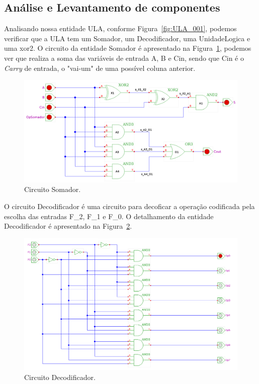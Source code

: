 \documentclass[a4paper,11pt]{report}
\begin{document}
\subsection {Análise e Levantamento de componentes}
Analisando nossa entidade ULA, conforme Figura~\ref{fig:ULA_001}, podemos verificar que a ULA tem um Somador, um Decodificador, uma UnidadeLogica e uma xor2.
O circuito da entidade Somador é apresentado na Figura~\ref{fig:Somador}, podemos ver que realiza a soma das variáveis de entrada A, B e Cin, sendo que Cin é o \emph{Carry} de entrada, o "vai-um" de uma possível coluna anterior.

\begin{figure}[H]
\centering
\includegraphics[width=1\textwidth]{figuras/somador.png}
\caption{Circuito Somador.}
\label{fig:Somador}
\end{figure}

O circuito Decodificador é uma circuito para decoficar a operação codificada pela escolha das entradas F\_2, F\_1 e F\_0. O detalhamento da entidade Decodificador é apresentado na Figura~\ref{fig:Decodificador}.

\begin{figure}[H]
\centering
\includegraphics[width=1\textwidth]{figuras/decodificador.png}
\caption{Circuito Decodificador.}
\label{fig:Decodificador}
\end{figure}
\end{document}
